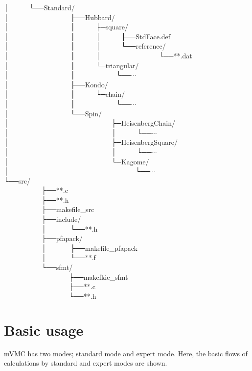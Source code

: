 │~~~~~~└──Standard/\\
│~~~~~~~~~~~~~~~~~~├──Hubbard/\\
│~~~~~~~~~~~~~~~~~~│~~~~~~├─square/\\
│~~~~~~~~~~~~~~~~~~│~~~~~~│~~~~~~├──StdFace.def\\
│~~~~~~~~~~~~~~~~~~│~~~~~~│~~~~~~└──reference/\\
│~~~~~~~~~~~~~~~~~~│~~~~~~│~~~~~~~~~~~~~~~~~└──**.dat\\
│~~~~~~~~~~~~~~~~~~│~~~~~~└─triangular/\\
│~~~~~~~~~~~~~~~~~~│~~~~~~~~~~~~└──$\cdots$\\
│~~~~~~~~~~~~~~~~~~├──Kondo/\\
│~~~~~~~~~~~~~~~~~~│~~~~~~└─chain/\\
│~~~~~~~~~~~~~~~~~~│~~~~~~~~~~~~└──$\cdots$\\
│~~~~~~~~~~~~~~~~~~└──Spin/\\
│~~~~~~~~~~~~~~~~~~~~~~~~~~~~~~├─HeisenbergChain/\\
│~~~~~~~~~~~~~~~~~~~~~~~~~~~~~~│~~~~~~└──$\cdots$\\
│~~~~~~~~~~~~~~~~~~~~~~~~~~~~~~├─HeisenbergSquare/\\
│~~~~~~~~~~~~~~~~~~~~~~~~~~~~~~│~~~~~~└──$\cdots$\\
│~~~~~~~~~~~~~~~~~~~~~~~~~~~~~~└─Kagome/\\
│~~~~~~~~~~~~~~~~~~~~~~~~~~~~~~~~~~~~~└──$\cdots$\\
└──src/\\
~~~~~~~~~~~├──**.c\\
~~~~~~~~~~~├──**.h\\
~~~~~~~~~~~├──makefile\_src\\
~~~~~~~~~~~├──include/\\
~~~~~~~~~~~│~~~~~~~└──**.h\\
~~~~~~~~~~~├──pfapack/\\
~~~~~~~~~~~│~~~~~~~├──makefile\_pfapack\\
~~~~~~~~~~~│~~~~~~~└──**.f\\
~~~~~~~~~~~└──sfmt/\\
~~~~~~~~~~~~~~~~~~~├──makefkie\_sfmt\\
~~~~~~~~~~~~~~~~~~~├──**.c\\
~~~~~~~~~~~~~~~~~~~└──**.h\\

\newpage
\section{Basic usage}
mVMC has two modes; standard mode and expert mode. 
Here, the basic flows of calculations by standard and expert modes are shown.

